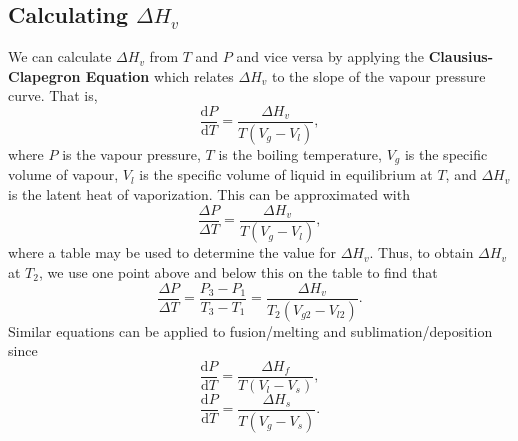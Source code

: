 \documentclass[11pt]{article}
\theoremstyle{plain} %
\theoremstyle{definition}
\theoremstyle{example}
\theoremstyle{remark}
\begin{document}
\subsection{Calculating $\Delta H_v$}
We can calculate $\Delta H_v$ from $T$ and $P$ and vice versa by applying the \textbf{Clausius-Clapegron Equation} which relates $\Delta H_v$ to the slope of the vapour pressure curve. That is,
$$\frac{\mathrm d P}{\mathrm d T} = \frac{\Delta H_v}{T(V_g-V_l)},$$
where $P$ is the vapour pressure, $T$ is the boiling temperature, $V_g$ is the specific volume of vapour, $V_l$ is the specific volume of liquid in equilibrium at $T$, and $\Delta H_v$ is the latent heat of vaporization. This can be approximated with
$$\frac{\Delta P}{\Delta T} = \frac{\Delta H_v}{T(V_g-V_l)},$$
where a table may be used to determine the value for $\Delta H_v$. Thus, to obtain $\Delta H_v$ at $T_2$, we use one point above and below this on the table to find that 
$$\frac{\Delta P}{\Delta T} = \frac{P_3-P_1}{T_3-T_1} = \frac{\Delta H_v}{T_2(V_{g2}-V_{l2})}.$$
Similar equations can be applied to fusion/melting and sublimation/deposition since
$$\frac{\mathrm d P}{\mathrm d T} = \frac{\Delta H_f}{T(V_l-V_s)},$$
$$\frac{\mathrm d P}{\mathrm d T} = \frac{\Delta H_s}{T(V_g-V_s)}.$$
\end{document}
